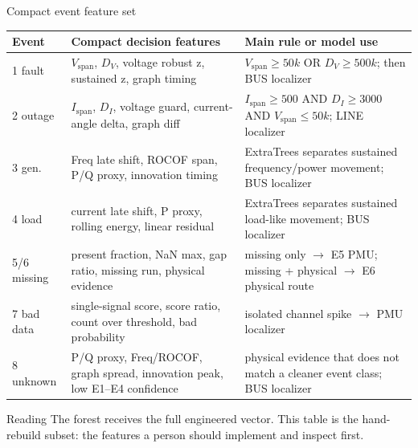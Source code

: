 ﻿\documentclass[10pt,aspectratio=169]{beamer}
\begin{document}
\begin{frame}{Compact event feature set}
\scriptsize
\centering
\begin{tabular}{p{}p{}p{}}
\toprule
\textbf{Event} & \textbf{Compact decision features} & \textbf{Main rule or model use}\\
\midrule
1 fault &
$V_{\mathrm{span}}$, $D_V$, voltage robust z, sustained z, graph timing &
$V_{\mathrm{span}}\ge50k$ OR $D_V\ge500k$; then BUS localizer\\
2 outage &
$I_{\mathrm{span}}$, $D_I$, voltage guard, current-angle delta, graph diff &
$I_{\mathrm{span}}\ge500$ AND $D_I\ge3000$ AND $V_{\mathrm{span}}\le50k$; LINE localizer\\
3 gen. &
Freq late shift, ROCOF span, P/Q proxy, innovation timing &
ExtraTrees separates sustained frequency/power movement; BUS localizer\\
4 load &
current late shift, P proxy, rolling energy, linear residual &
ExtraTrees separates sustained load-like movement; BUS localizer\\
5/6 missing &
present fraction, NaN max, gap ratio, missing run, physical evidence &
missing only $\rightarrow$ E5 PMU; missing + physical $\rightarrow$ E6 physical route\\
7 bad data &
single-signal score, score ratio, count over threshold, bad probability &
isolated channel spike $\rightarrow$ PMU localizer\\
8 unknown &
P/Q proxy, Freq/ROCOF, graph spread, innovation peak, low E1--E4 confidence &
physical evidence that does not match a cleaner event class; BUS localizer\\
\bottomrule
\end{tabular}
\vspace{2mm}
\begin{alertblock}{Reading}
The forest receives the full engineered vector. This table is the hand-rebuild subset: the features a person should implement and inspect first.
\end{alertblock}
\end{frame}
\end{document}
